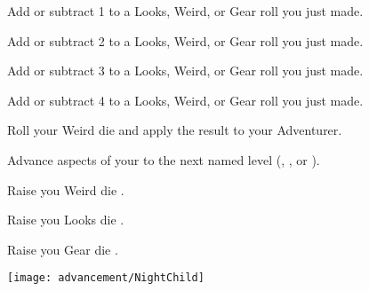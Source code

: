\begin{multicols*}{2}


Add or subtract 1 to a Looks, Weird, or Gear roll you just made.


Add or subtract 2 to a Looks, Weird, or Gear roll you just made.


Add or subtract 3 to a Looks, Weird, or Gear roll you just made.


Add or subtract 4 to a Looks, Weird, or Gear roll you just made.



Roll your Weird die and apply the result to your Adventurer.

\cbreak


Advance  aspects of your  to the next named level (\DEATH, \INJURY, or \INSANITY).



Raise you Weird die \DCUP.


Raise you Looks die \DCUP.


Raise you Gear die \DCUP.

\end{multicols*}
\newpage

\begin{center}
\texttt{[image: advancement/NightChild]}
\end{center}

